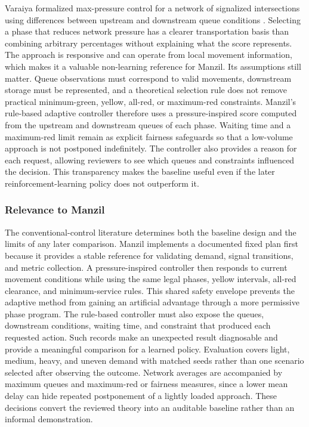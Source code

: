 Varaiya formalized max-pressure control for a network of signalized intersections using differences between upstream and downstream queue conditions \cite{varaiya2013maxpressure}. Selecting a phase that reduces network pressure has a clearer transportation basis than combining arbitrary percentages without explaining what the score represents. The approach is responsive and can operate from local movement information, which makes it a valuable non-learning reference for Manzil. Its assumptions still matter. Queue observations must correspond to valid movements, downstream storage must be represented, and a theoretical selection rule does not remove practical minimum-green, yellow, all-red, or maximum-red constraints. Manzil's rule-based adaptive controller therefore uses a pressure-inspired score computed from the upstream and downstream queues of each phase. Waiting time and a maximum-red limit remain as explicit fairness safeguards so that a low-volume approach is not postponed indefinitely. The controller also provides a reason for each request, allowing reviewers to see which queues and constraints influenced the decision. This transparency makes the baseline useful even if the later reinforcement-learning policy does not outperform it.

\subsubsection{Relevance to Manzil}

The conventional-control literature determines both the baseline design and the limits of any later comparison. Manzil implements a documented fixed plan first because it provides a stable reference for validating demand, signal transitions, and metric collection. A pressure-inspired controller then responds to current movement conditions while using the same legal phases, yellow intervals, all-red clearance, and minimum-service rules. This shared safety envelope prevents the adaptive method from gaining an artificial advantage through a more permissive phase program. The rule-based controller must also expose the queues, downstream conditions, waiting time, and constraint that produced each requested action. Such records make an unexpected result diagnosable and provide a meaningful comparison for a learned policy. Evaluation covers light, medium, heavy, and uneven demand with matched seeds rather than one scenario selected after observing the outcome. Network averages are accompanied by maximum queues and maximum-red or fairness measures, since a lower mean delay can hide repeated postponement of a lightly loaded approach. These decisions convert the reviewed theory into an auditable baseline rather than an informal demonstration.

